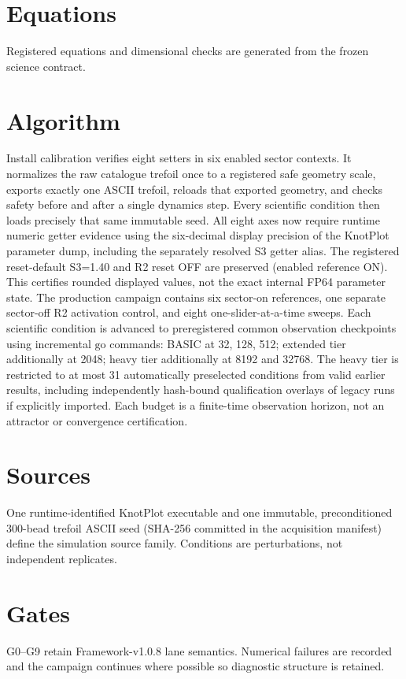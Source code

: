 \documentclass[11pt,a4paper]{article}
\begin{document}
\section{Equations}
Registered equations and dimensional checks are generated from the frozen science contract.
\section{Algorithm}
Install calibration verifies eight setters in six enabled sector contexts. It normalizes the raw catalogue trefoil once to a registered safe geometry scale, exports exactly one ASCII trefoil, reloads that exported geometry, and checks safety before and after a single dynamics step. Every scientific condition then loads precisely that same immutable seed. All eight axes now require runtime numeric getter evidence using the six-decimal display precision of the KnotPlot parameter dump, including the separately resolved S3 getter alias. The registered reset-default S3=1.40 and R2 reset OFF are preserved (enabled reference ON). This certifies rounded displayed values, not the exact internal FP64 parameter state. The production campaign contains six sector-on references, one separate sector-off R2 activation control, and eight one-slider-at-a-time sweeps. Each scientific condition is advanced to preregistered common observation checkpoints using incremental $\mathrm{go}$ commands: BASIC at 32, 128, 512; extended tier additionally at 2048; heavy tier additionally at 8192 and 32768. The heavy tier is restricted to at most 31 automatically preselected conditions from valid earlier results, including independently hash-bound qualification overlays of legacy runs if explicitly imported. Each budget is a finite-time observation horizon, not an attractor or convergence certification.

\section{Sources}
One runtime-identified KnotPlot executable and one immutable, preconditioned 300-bead trefoil ASCII seed (SHA-256 committed in the acquisition manifest) define the simulation source family. Conditions are perturbations, not independent replicates.
\section{Gates}
G0--G9 retain Framework-v1.0.8 lane semantics. Numerical failures are recorded and the campaign continues where possible so diagnostic structure is retained.
\end{document}
